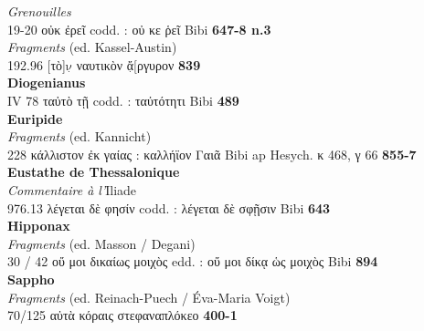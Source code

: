 \documentclass{book}%
\newcommand{\italique}[1]{\textit{#1}}%
\newcommand{\espace}[1]{\hspace{#1}}%
\newlength{\larg}%
\newcommand{\decalageN}[1]{%
\settowidth{\larg}{#1}%
\espace{-\larg}%
}
\newcommand{\douteux}[1]{$\underset{\cdot}{\text{#1}}$}
\newcommand{\Auteur}[1]{\hspace*{-1.5cm}\textbf{#1} \\}
\newcommand{\livre}[1]{\hspace*{0.5cm}#1\\}
\newcommand{\passage}[3]{\hspace*{1.0cm} #1 \hspace*{1.2cm}\decalageN{#1} #2 \dotfill \hfill	\textbf{#3}\\} %
\begin{document}
\livre{\italique{Grenouilles}}
\passage{19-20}{οὐκ ἐρεῖ codd. : οὐ κε ῥεῖ Bibi}{647-8 n.3}
\livre{\italique{Fragments} (ed. Kassel-Austin)}
\passage{192.96}{[τὸ]\douteux{ν} ναυτικὸν \douteux{ἄ}[ργυρον}{839}
\Auteur{Diogenianus}
\passage{IV 78}{ταὐτὸ τῇ codd. : ταὐτότητι Bibi}{489}
\Auteur{Euripide}
\livre{\italique{Fragments} (ed. Kannicht)}
\passage{228}{κάλλιστον ἐκ γαίας : καλλήϊον Γαιᾶ Bibi ap Hesych. κ 468, γ 66}{855-7}
\Auteur{Eustathe de Thessalonique}
\livre{\italique{Commentaire à l'}Iliade}
\passage{976.13}{λέγεται δὲ φησίν codd. : λέγεται δὲ σφῇσιν Bibi}{643}
\Auteur{Hipponax}
\livre{\italique{Fragments} (ed. Masson / Degani)}
\passage{30 / 42}{οὔ μοι δικαίως μοιχὸς edd. : οὔ μοι δίκᾳ ὡς μοιχὸς Bibi}{894}
\Auteur{Sappho}
\livre{\italique{Fragments} (ed. Reinach-Puech / Éva-Maria Voigt)}
\passage{70/125}{αὐτὰ κόραις στεφαναπλόκεο}{400-1}





\clearpage
\end{document}
